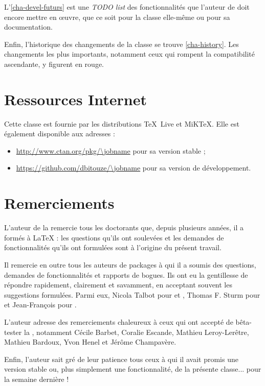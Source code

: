 L'\vref{cha-devel-futurs} est une \emph{TODO list} des fonctionnalités que
l'auteur de \yat{} doit encore mettre en œuvre, que ce soit pour la classe
elle-même ou pour sa documentation.

Enfin, l'historique des changements de la classe se trouve \vref{cha-history}.
Les changements les plus importants, notamment ceux qui rompent la compatibilité
ascendante, y figurent en rouge.

\section{Ressources Internet}
\label{sec-ressources-internet}

Cette classe est fournie par les distributions \TeX~Live et MiK\TeX{}. Elle est
également disponible aux adresses :
\begin{itemize}
\item \url{http://www.ctan.org/pkg/\jobname} pour sa version stable ;
\item \url{https://github.com/dbitouze/\jobname} pour sa version de
  développement.
\end{itemize}

\section{Remerciements}
\label{sec-remerciements}

L'auteur de la \yatcl{} remercie tous les doctorants que, depuis plusieurs
années, il a formés à \LaTeX{} : les questions qu'ils ont soulevées et les
demandes de fonctionnalités qu'ils ont formulées sont à l'origine du présent
travail.

Il remercie en outre tous les auteurs de packages à qui il a soumis  des questions, demandes de fonctionnalités et rapports
de bogues. Ils ont eu la gentillesse de répondre rapidement, clairement et
savamment, en acceptant souvent les suggestions formulées. Parmi eux, Nicola
Talbot pour  et , Thomas F. Sturm
pour  et Jean-François pour .

L'auteur adresse des remerciements chaleureux à ceux qui ont accepté de
bêta-tester la \yatcl{}, notamment Cécile Barbet, Coralie Escande, Mathieu
Leroy-Lerêtre, Mathieu Bardoux, Yvon Henel et Jérôme Champavère.

Enfin, l'auteur sait gré de leur patience tous ceux à qui il avait promis une
version stable ou, plus simplement une fonctionnalité, de la présente
classe... pour la semaine dernière !
